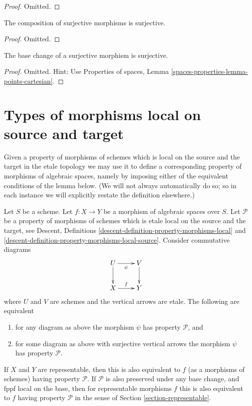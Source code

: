 \begin{proof}
Omitted.
\end{proof}

\begin{lemma}
\label{lemma-composition-surjective}
The composition of surjective morphisms is surjective.
\end{lemma}

\begin{proof}
Omitted.
\end{proof}

\begin{lemma}
\label{lemma-base-change-surjective}
The base change of a surjective morphism is surjective.
\end{lemma}

\begin{proof}
Omitted. Hint: Use
Properties of spaces, Lemma \ref{spaces-properties-lemma-points-cartesian}.
\end{proof}








\section{Types of morphisms local on source and target}
\label{section-local-source-target}

\noindent
Given a property of morphisms of schemes which is local on the source
and the target in the etale topology we may use it to define a corresponding
property of morphisms of algebraic spaces, namely by imposing either of
the equivalent conditions of the lemma below. (We will not always
automatically do so; so in each instance we will explicitly restate
the definition elsewhere.)

\begin{lemma}
\label{lemma-local-source-target}
Let $S$ be a scheme.
Let $f : X \to Y$ be a morphism of algebraic spaces over $S$.
Let $\mathcal{P}$ be a property of morphisms of schemes
which is etale local on the source and the target, see
Descent, Definitions \ref{descent-definition-property-morphisms-local} and
\ref{descent-definition-property-morphisms-local-source}.
Consider commutative diagrams
$$
\xymatrix{
U \ar[d] \ar[r]_\psi & V \ar[d] \\
X \ar[r]^f & Y
}
$$
where $U$ and $V$ are schemes and the vertical arrows are etale.
The following are equivalent
\begin{enumerate}
\item for any diagram as above the morphism $\psi$ has property
$\mathcal{P}$, and
\item for some diagram as above with surjective vertical arrows
the morphism $\psi$ has property $\mathcal{P}$.
\end{enumerate}
If $X$ and $Y$ are representable, then this is also
equivalent to $f$ (as a morphisms of schemes) having property $\mathcal{P}$.
If $\mathcal{P}$ is also preserved under any base change, and
fppf local on the base, then for representable morphisms $f$ this
is also equivalent to $f$ having property $\mathcal{P}$ in the sense
of Section \ref{section-representable}.
\end{lemma}

